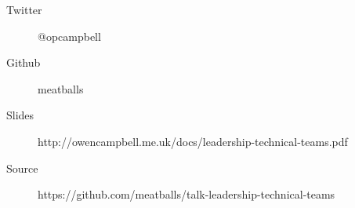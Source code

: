 

\begin{frame}{}
  \begin{description}
    \item [Twitter] @opcampbell
    \item [Github] meatballs
  \end{description}
  \vfill
  \begin{description}
    \item [Slides] {\small http://owencampbell.me.uk/docs/leadership-technical-teams.pdf}
    \item [Source] {\small https://github.com/meatballs/talk-leadership-technical-teams}
  \end{description}

\end{frame}
